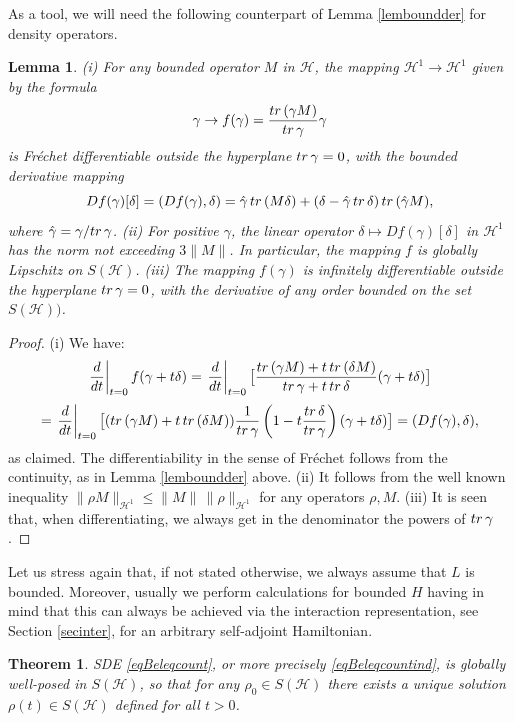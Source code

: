 \documentclass[10pt,a4paper]{amsart}
\def\HC{\mathcal{H}}
\def\tr{\rm{tr}}
\def\de{\delta}
\def\ga{\gamma}
\newtheorem{theorem}{Theorem}[section]
\newtheorem{lemma}{Lemma}[section]
\begin{document}
As a tool, we will need the following counterpart of Lemma \ref{lemboundder} for density operators.

\begin{lemma}
 \label{lemboundderden}
 (i) For any bounded operator $M$ in $\HC$, the mapping
 $\HC^1 \to \HC^1$ given by the formula
 \[
 \ga \to f(\ga)= \frac{{\tr}\, (\ga M)}{{\tr}\, \ga} \ga
\]
is Fr\'echet differentiable outside the hyperplane ${\tr}\, \ga =0$,  with the bounded derivative mapping
\[
Df(\ga)[\de]=(Df(\ga), \de)
=\hat \ga \, {\tr}\, (M\de) +(\de-\hat \ga \,{\tr}\, \de) \,{\tr}\, (\hat \ga M),
 \]
 where $\hat \ga=\ga/{\tr} \, \ga$. (ii) For positive $\ga$, the linear operator $\de\mapsto Df(\ga)[\de]$
in $\HC^1$ has the norm not exceeding $3\|M\|$.
In particular, the mapping $f$ is globally Lipschitz on $S(\HC)$. (iii) The mapping $f(\ga)$ is infinitely differentiable
outside the hyperplane ${\tr}\, \ga =0$, with the derivative of any order bounded on the set $S(\HC))$.
\end{lemma}

\begin{proof}
(i) We have:
\[
\left.\frac{d}{dt}\right|_{t=0} f(\ga+t\de)
=\left.\frac{d}{dt}\right|_{t=0}
\bigl[\frac{{\tr}\, (\ga M)+t\, {\tr}\, (\de M)}{{\tr}\, \ga +t\, {\tr}\, \de}
 (\ga+t\de)\bigr]
\]
\[
=\left.\frac{d}{dt}\right|_{t=0}\bigl[ ({\tr}\, (\ga M)+t\, {\tr}\, (\de M))\frac{1}{{\tr}\, \ga}
\left(1-t \frac{{\tr}\, \de}{{\tr}\, \ga}\right)(\ga +t \de)\bigr]
=(Df(\ga),\de),
\]
as claimed. The differentiability in the sense of Fr\'echet follows from the continuity,
as in Lemma  \ref{lemboundder} above. (ii) It follows from the well known inequality
$\|\rho M\|_{\HC^1}\le \|M\| \, \|\rho\|_{\HC^1}$ for any operators $\rho, M$. (iii)
It is seen that, when differentiating, we always get in the denominator
the powers of ${\tr}\, \ga$.
\end{proof}

Let us stress again that, if not stated otherwise, we always assume that $L$ is bounded. Moreover,
usually we perform calculations for bounded $H$ having in mind that this can always be achieved
via the interaction representation, see Section \ref{secinter}, for an arbitrary self-adjoint Hamiltonian.

\begin{theorem}
\label{JumpWellSDE}
SDE \eqref{eqBeleqcount}, or more precisely \eqref{eqBeleqcountind},
is globally well-posed in $S(\HC)$, so that for any $\rho_0\in S(\HC)$ there exists
a unique solution $\rho(t)\in S(\HC)$ defined for all $t>0$.
\end{theorem}
\end{document}
